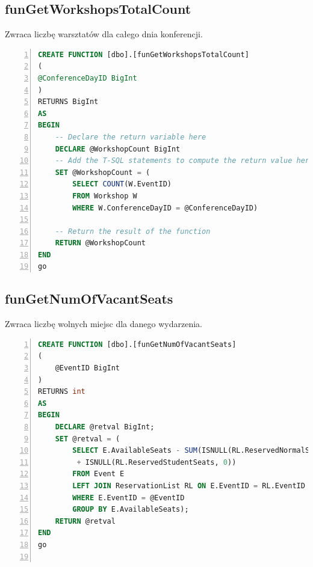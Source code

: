 \documentclass[]{article}
\begin{document}
	\subsection{funGetWorkshopsTotalCount}
	Zwraca liczbę warsztatów dla całego dnia konferencji.
	\begin{lstlisting}[language=SQL,
						showspaces=false,
						basicstyle=\ttfamily,
						numbers=left,
						numberstyle=\tiny,
						backgroundcolor=\color{lightg},
						keywordstyle=\color{lightblue},
						commentstyle=\color{gray}]
CREATE FUNCTION [dbo].[funGetWorkshopsTotalCount]
(
@ConferenceDayID BigInt
)
RETURNS BigInt
AS
BEGIN
	-- Declare the return variable here
	DECLARE @WorkshopCount BigInt
	-- Add the T-SQL statements to compute the return value here
	SET @WorkshopCount = (
		SELECT COUNT(W.EventID)
		FROM Workshop W
		WHERE W.ConferenceDayID = @ConferenceDayID)
		
	-- Return the result of the function
	RETURN @WorkshopCount
END
go

	\end{lstlisting}
	
	\subsection{funGetNumOfVacantSeats}
	Zwraca liczbę wolnych miejsc dla danego wydarzenia.
	\begin{lstlisting}[language=SQL,
	showspaces=false,
	basicstyle=\ttfamily,
	numbers=left,
	numberstyle=\tiny,
	backgroundcolor=\color{lightg},
	keywordstyle=\color{lightblue},
	commentstyle=\color{gray}]
CREATE FUNCTION [dbo].[funGetNumOfVacantSeats] 
(
	@EventID BigInt
)
RETURNS int
AS
BEGIN
	DECLARE @retval BigInt;
	SET @retval = (
		SELECT E.AvailableSeats - SUM(ISNULL(RL.ReservedNormalSeats, 0)
		 + ISNULL(RL.ReservedStudentSeats, 0))
		FROM Event E
		LEFT JOIN ReservationList RL ON E.EventID = RL.EventID
		WHERE E.EventID = @EventID
		GROUP BY E.AvailableSeats);
	RETURN @retval
END
go
	
	\end{lstlisting}
	
\end{document}
